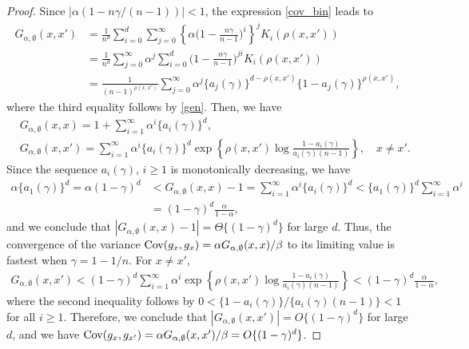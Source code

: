 \documentclass[a4paper,11pt]{article}
\theoremstyle{plain}
\theoremstyle{definition}
\begin{document}
\begin{proof}
  Since $|\alpha(1-n\gamma/(n-1))|<1$, the expression
  \eqref{cov_bin} leads to
  \begin{align*}
    G_{\alpha,\emptyset}(x,x')&=\frac{1}{n^d}
    \sum_{i=0}^d\sum_{j=0}^\infty
    \left\{\alpha\Big(1-\frac{n\gamma}{n-1}\Big)^i\right\}^j
    K_i(\rho(x,x'))\\
    &=\frac{1}{n^d}
    \sum_{j=0}^\infty\alpha^j\sum_{i=0}^d
    \Big(1-\frac{n\gamma}{n-1}\Big)^{ji}
    K_i(\rho(x,x'))\\
    &=\frac{1}{(n-1)^{\rho(x,x')}}
    \sum_{j=0}^\infty\alpha^j
    \{a_j(\gamma)\}^{d-\rho(x,x')}\{1-a_j(\gamma)\}^{\rho(x,x')},
  \end{align*}
  where the third equality follows by \eqref{gen}. Then,
  we have
  \begin{align*}
    &G_{\alpha,\emptyset}(x,x)=1+
    \sum_{i=1}^\infty\alpha^i\{a_i(\gamma)\}^d, \\
    &G_{\alpha,\emptyset}(x,x')
    =\sum_{i=1}^\infty \alpha^i\{a_i(\gamma)\}^d
    \exp\left\{\rho(x,x')\log\frac{1-a_i(\gamma)}{a_i(\gamma)(n-1)}\right\},
    \quad x\neq x'.
  \end{align*}
  Since the sequence $a_i(\gamma)$, $i\ge 1$ is monotonically
  decreasing, we have
  \begin{align*}
    \alpha\{a_1(\gamma)\}^d=\alpha(1-\gamma)^d&<
    G_{\alpha,\emptyset}(x,x)-1
    =\sum_{i=1}^\infty\alpha^i\{a_i(\gamma)\}^d
    <\{a_1(\gamma)\}^d\sum_{i=1}^\infty\alpha^i\\
    &=(1-\gamma)^d\frac{\alpha}{1-\alpha},
   \end{align*}
  and we conclude that
  $|G_{\alpha,\emptyset}(x,x)-1|=\Theta\{(1-\gamma)^d\}$
  for large $d$.
  Thus, the convergence of the variance
  ${\rm Cov}(g_x,g_{x})=\alpha G_{\alpha,\emptyset}(x,x)/\beta$
  to its limiting value is fastest when $\gamma=1-1/n$. 
  For $x\neq x'$,
  \begin{align*}
    G_{\alpha,\emptyset}(x,x')
    <(1-\gamma)^d\sum_{i=1}^\infty \alpha^i
    \exp\left\{\rho(x,x')\log\frac{1-a_i(\gamma)}{a_i(\gamma)(n-1)}\right\}
    <(1-\gamma)^d\frac{\alpha}{1-\alpha},
  \end{align*}
  where the second inequality follows by 
  $0<\{1-a_i(\gamma)\}/\{a_i(\gamma)(n-1)\}<1$ for all $i\ge 1$.
  Therefore, we conclude that
  $|G_{\alpha,\emptyset}(x,x')|=O\{(1-\gamma)^d\}$ for large $d$,
  and we have
  ${\rm Cov}(g_x,g_{x'})=\alpha G_{\alpha,\emptyset}(x,x')/\beta=O\{(1-\gamma)^d\}$.
\end{proof}
\end{document}
